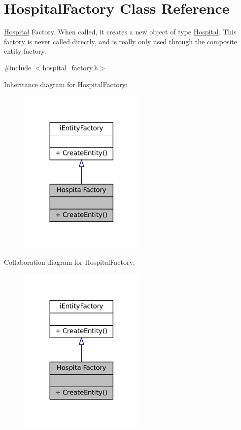 \hypertarget{classHospitalFactory}{}\section{Hospital\+Factory Class Reference}
\label{classHospitalFactory}


\hyperlink{classHospital}{Hospital} Factory. When called, it creates a new object of type \hyperlink{classHospital}{Hospital}. This factory is never called directly, and is really only used through the composite entity factory.  




{\ttfamily \#include $<$hospital\+\_\+factory.\+h$>$}



Inheritance diagram for Hospital\+Factory\+:\nopagebreak
\begin{figure}[H]
\begin{center}
\leavevmode
\includegraphics[width=176pt]{classHospitalFactory__inherit__graph}
\end{center}
\end{figure}


Collaboration diagram for Hospital\+Factory\+:\nopagebreak
\begin{figure}[H]
\begin{center}
\leavevmode
\includegraphics[width=176pt]{classHospitalFactory__coll__graph}
\end{center}
\end{figure}
